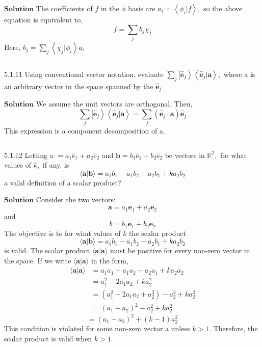 \documentclass{article}
\begin{document}
\begin{flushleft}
$\boxed{\textbf{Solution}}$ The coefficients of $f$ in the $\phi$ basis are $a_{i}=\left\langle\phi_{i} | f\right\rangle,$ so the above equation is equivalent to,
$$
f=\sum_{j} b_{j} \chi_{j}
$$
Here, $b_{j}=\sum_{j}\left\langle\chi_{j} | \phi_{i}\right\rangle a_{i}$

$$$$

\begin{mybox}{5.1.11}
Using conventional vector notation, evaluate $\sum_{j}\left|\hat{\mathbf{e}}_{j}\right\rangle\left\langle\hat{\mathbf{e}}_{j} | \mathbf{a}\right\rangle,$ where a is an arbitrary vector in the space spanned by the $\hat{\mathbf{e}}_{j}$
\end{mybox}

$\boxed{\textbf{Solution}}$  We assume the unit vectors are orthogonal. Then,
$$
\sum_{j}\left|\hat{\mathbf{e}}_{j}\right\rangle\left\langle\hat{\mathbf{e}}_{j} | \mathbf{a}\right\rangle=\sum_{j}\left(\hat{\mathbf{e}}_{j} \cdot \mathbf{a}\right) \hat{\mathbf{e}}_{j}
$$
This expression is a component decomposition of a.

$$$$

\begin{mybox}{5.1.12}
Letting a $=a_{1} \hat{\mathrm{e}}_{1}+a_{2} \hat{\mathrm{e}}_{2}$ and $\mathbf{b}=b_{1} \hat{\mathrm{e}}_{1}+b_{2} \hat{\mathrm{e}}_{2}$ be vectors in $\mathbb{R}^{2},$ for what values of $k,$ if
any, is
$$
\langle\mathbf{a} | \mathbf{b}\rangle=a_{1} b_{1}-a_{1} b_{2}-a_{2} b_{1}+k a_{2} b_{2}
$$
a valid definition of a scalar product?
\end{mybox}

$\boxed{\textbf{Solution}}$ Consider the two vectors:
$$\mathbf{a}=a_{1} \mathbf{e}_{1}+a_{2} \mathbf{e}_{2}$$ 
and 
$$b=b_{1} \mathbf{e}_{1}+b_{2} \mathbf{e}_{2}$$
The objective is to for what values of $k$ the scalar product 
$$\langle\mathbf{a} | \mathbf{b}\rangle=a_{1} b_{1}-a_{1} b_{2}-a_{2} b_{1}+k a_{2} b_{2}$$
is valid. The scalar product $\langle\mathbf{a} | \mathbf{a}\rangle$ must be positive for every non-zero vector in the space. If we write
$\langle\mathbf{a} | \mathbf{a}\rangle$ in the form,
$$
\begin{aligned}
\langle\mathbf{a} | \mathbf{a}\rangle &=a_{1} a_{1}-a_{1} a_{2}-a_{2} a_{1}+k a_{2} a_{2} \\
&=a_{1}^{2}-2 a_{1} a_{2}+k a_{2}^{2} \\
&=\left(a_{1}^{2}-2 a_{1} a_{2}+a_{2}^{2}\right)-a_{2}^{2}+k a_{2}^{2} \\
&=\left(a_{1}-a_{2}\right)^{2}-a_{2}^{2}+k a_{2}^{2}
\end{aligned}
$$
$$
=\left(a_{1}-a_{2}\right)^{2}+(k-1) a_{2}^{2}
$$
This condition is violated for some non-zero vector a unless $k>1$.
Therefore, the scalar product is valid when $k>1$.






\end{flushleft}
\end{document}
